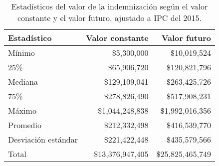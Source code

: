 \begin{table}[!htbp]
\centering
\caption{Estadísticos del valor de la indemnización según el valor constante
y el valor futuro, ajustado a IPC del 2015.} 
\label{tab:indemnizacion}
\begin{tabular}{lrr}
  \hline
Estadístico & Valor constante & Valor futuro \\ 
  \hline
Mínimo & \$5,300,000 & \$10,019,524 \\ 
  25\% & \$65,906,720 & \$120,821,796 \\ 
  Mediana & \$129,109,041 & \$263,425,726 \\ 
  75\% & \$278,826,490 & \$517,908,231 \\ 
  Máximo & \$1,044,248,838 & \$1,992,016,356 \\ 
  Promedio & \$212,332,498 & \$416,539,770 \\ 
  Desviación estándar & \$221,422,448 & \$435,579,566 \\ 
  Total & \$13,376,947,405 & \$25,825,465,749 \\ 
   \hline
\end{tabular}
\end{table}
